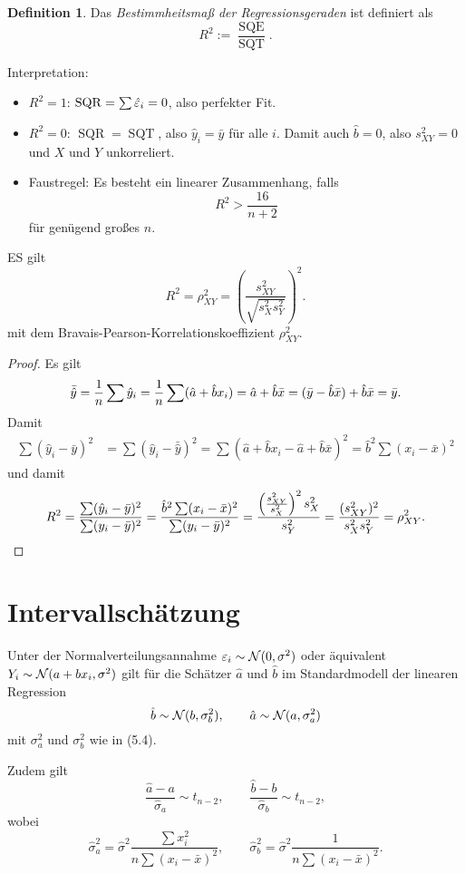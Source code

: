 \documentclass[
 a4paper,
 12pt,
 parskip=half
 ]{scrreprt}
\theoremstyle{plain}
\theoremstyle{definition}
\newtheorem{defn}[thm]{Definition}
\numberwithin{equation}{chapter}
\begin{document}
\begin{defn}
  Das \emph{Bestimmheitsmaß der Regressionsgeraden} ist definiert als
  \[ R^2 := \frac{\operatorname{SQE}}{\operatorname{SQT}}. \]
\end{defn}

Interpretation:
\begin{itemize}
\item $R^2 = 1$: $\operatorname{SQR} = \sum \hat{\varepsilon}_i = 0$, also perfekter
  Fit.
\item $R^2 = 0$: $\operatorname{SQR} = \operatorname{SQT}$, also $\hat{y}_i =
  \bar{y}$ für alle $i$. Damit auch $\hat{b} = 0$, also $s_{XY}^2 = 0$ und $X$
  und $Y$ unkorreliert.
\item Faustregel: Es besteht ein linearer Zusammenhang, falls
  \[ R^2 > \frac{16}{n+2} \]
  für genügend großes $n$.
\end{itemize}

\begin{lem}
  ES gilt
  \[ R^2 = \rho_{XY}^2
    = \left( \frac{s_{XY}^2}{\sqrt{s_X^2 s_Y^2}} \right)^2. \]
  mit dem Bravais-Pearson-Korrelationskoeffizient $\rho_{XY}^2$.
\end{lem}

\begin{proof}
  Es gilt
  \[ \bar{\hat{y}} = \frac{1}{n} \sum \hat{y}_i = \frac{1}{n} \sum (\hat{a} + \hat{b}
    x_i) = \hat{a} + \hat{b} \bar{x}
    = (\bar{y}-\hat{b} \bar{x}) + \hat{b} \bar{x} = \bar{y}. \]
  Damit
  \begin{align*}
    \sum (\hat{y}_i - \bar{y})^2
    &= \sum (\hat{y}_i - \bar{\hat{y}} )^2
      = \sum( \hat{a} + \hat{b} x_i - \hat{a} + \hat{b} \bar{x})^2
      = \hat{b}^2 \sum (x_i - \bar{x})^2
  \end{align*}
  und damit
  \[ R^2 = \frac{\sum( \hat{y}_i - \bar{y})^2}{\sum (y_i - \bar{y})^2}
    = \frac{\hat{b}^2 \sum (x_i - \bar{x})^2}{\sum(y_i - \bar{y})^2}
    = \frac{ \left(  \frac{s_{XY}^2}{s_X^2} \right)^2 s_X^2}{s_Y^2}
    = \frac{(s_{XY}^2)^2}{s_X^2 s_Y^2} = \rho_{XY}^2. \qedhere
  \]
\end{proof}

\section{Intervallschätzung}
\begin{lem}
  Unter der Normalverteilungsannahme $\varepsilon_i \sim \mathcal{N}(0,\sigma^2)$ oder
  äquivalent $Y_i \sim \mathcal{N}(a+b x_i, \sigma^2)$
  gilt für die Schätzer $\hat{a}$ und $\hat{b}$ im Standardmodell der linearen
  Regression
  \[ \hat{b} \sim \mathcal{N}(b, \sigma_b^2), \qquad
    \hat{a} \sim \mathcal{N}(a, \sigma_a^2) \]
  mit $\sigma_a^2$ und $\sigma_b^2$ wie in (5.4).

  Zudem gilt
  \[ \frac{\hat{a} - a}{\hat{\sigma}_a} \sim t_{n-2}, \qquad
    \frac{\hat{b} - b}{\hat{\sigma}_b} \sim t_{n-2}, \]
  wobei
  \[ \hat{\sigma}_a^2 = \hat{\sigma}^2 \frac{\sum x_i^2}{n \sum (x_i -
      \bar{x})^2}, \qquad
    \hat{\sigma}_b^2 = \hat{\sigma}^2 \frac{1}{n \sum (x_i -
      \bar{x})^2}.
  \]
\end{lem}
\end{document}

